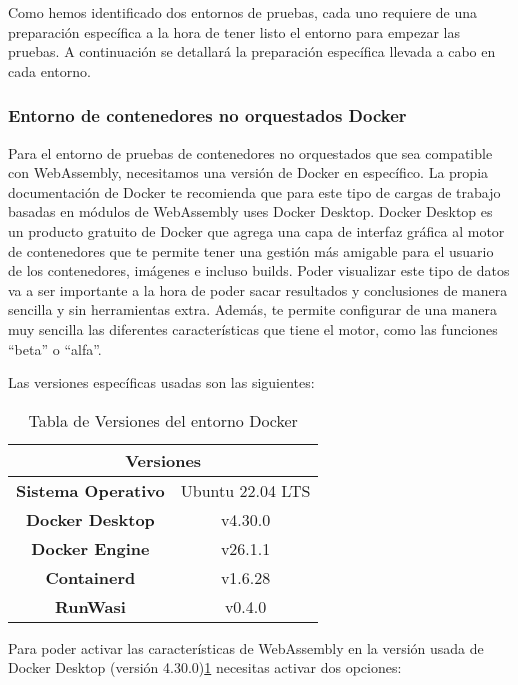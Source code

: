 Como hemos identificado dos entornos de pruebas, cada uno requiere de una preparación específica a la hora de tener listo el entorno para empezar las pruebas. A continuación se detallará la preparación específica llevada a cabo en cada entorno.

\subsubsection{Entorno de contenedores no orquestados Docker}

Para el entorno de pruebas de contenedores no orquestados que sea compatible con WebAssembly, necesitamos una versión de Docker en específico. La propia documentación de Docker te recomienda que para este tipo de cargas de trabajo basadas en módulos de WebAssembly uses Docker Desktop. Docker Desktop es un producto gratuito de Docker que agrega una capa de interfaz gráfica al motor de contenedores que te permite tener una gestión más amigable para el usuario de los contenedores, imágenes e incluso builds. Poder visualizar este tipo de datos va a ser importante a la hora de poder sacar resultados y conclusiones de manera sencilla y sin herramientas extra. Además, te permite configurar de una manera muy sencilla las diferentes características que tiene el motor, como las funciones “beta” o “alfa”.

Las versiones específicas usadas son las siguientes:

\begin{table}[h!]
    \centering
    \begin{tabular}{|c|c|} \hline 
    
    \multicolumn{2}{|c|}{\textbf{Versiones}}\\ \hline 
        \textbf{Sistema Operativo} & Ubuntu 22.04 LTS\\ \hline 
        \textbf{Docker Desktop} & v4.30.0\\ \hline 
        \textbf{Docker Engine} & v26.1.1\\ \hline 
        \textbf{Containerd} & v1.6.28\\ \hline 
        \textbf{RunWasi} & v0.4.0\\ \hline
    \end{tabular}
    
    \caption{Tabla de Versiones del entorno Docker}
    \label{tab:tabla-de-versiones-docker}
\end{table}

Para poder activar las características de WebAssembly en la versión usada de Docker Desktop (versión 4.30.0)\ref{tab:tabla-de-versiones-docker} necesitas activar dos opciones:


